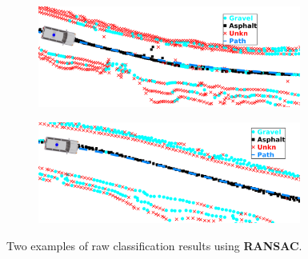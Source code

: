 \documentclass[numbered,pdftex]{ohio-etd}
\begin{document}
{{		%
		\begin{figure}[H]
			\centering
			\begin{subfigure}[b]{\textwidth}
				\centering
				\includegraphics[width=0.95\textwidth]{Defense_Images/db1ransac}
				\caption{}
				\label{fig:db1ransac}
			\end{subfigure}
			\vspace{1cm} %
			\begin{subfigure}[b]{\textwidth}
				\centering
				\includegraphics[width=0.95\textwidth]{Defense_Images/db2ransac}
				\caption{}
				\label{fig:db2ransac}
			\end{subfigure}
			\caption[Raw Result Example - RANSAC Spatial Reference Point]{Two examples of raw classification results using \textbf{RANSAC}. }
			\label{fig:ransac_raw_results_example}
		\end{figure}
		
}}
\end{document}
